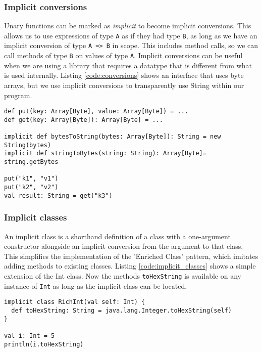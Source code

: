 \subsubsection{Implicit conversions}
Unary functions can be marked as {\it implicit} to become implicit conversions. This allows us to use expressions of type \texttt{A} as if they had type \texttt{B}, as long as we have an implicit conversion of type \texttt{A => B} in scope. This includes method calls, so we can call methods of type \texttt{B} on values of type \texttt{A}. Implicit conversions can be useful when we are using a library that requires a datatype that is different from what is used internally. Listing \ref{code:conversions} shows an interface that uses byte arrays, but we use implicit conversions to transparently use String within our program.

\begin{lstlisting}[caption=Implicit conversions, label=code:conversions, float]
def put(key: Array[Byte], value: Array[Byte]) = ...
def get(key: Array[Byte]): Array[Byte] = ...

implicit def bytesToString(bytes: Array[Byte]): String = new String(bytes)
implicit def stringToBytes(string: String): Array[Byte]= string.getBytes

put("k1", "v1")
put("k2", "v2")
val result: String = get("k3")
\end{lstlisting}

\subsubsection{Implicit classes}
An implicit class is a shorthand definition of a class with a one-argument constructor alongside an implicit conversion from the argument to that class. This simplifies the implementation of the 'Enriched Class' pattern, which imitates adding methods to existing classes. Listing \ref{code:implicit_classes} shows a simple extension of the Int class. Now the methods \texttt{toHexString} is available on any instance of \texttt{Int} as long as the implicit class can be located.

\begin{lstlisting}[caption=Implicit class, label=code:implicit_classes, float]
implicit class RichInt(val self: Int) {
  def toHexString: String = java.lang.Integer.toHexString(self)
}

val i: Int = 5
println(i.toHexString)
\end{lstlisting}


